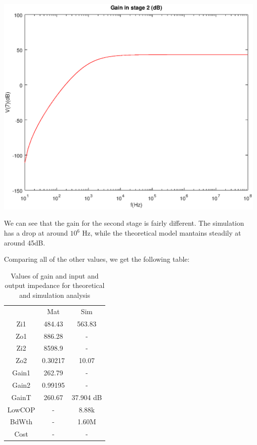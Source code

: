 \hspace{1mm}
\begin{minipage}[c]{0.50\linewidth}
\includegraphics[width=1\linewidth]{vo2.eps}
\end{minipage}

We can see that the gain for the second stage is fairly different. The simulation has a drop at around $10^6$ Hz, while the theoretical model mantains steadily at around 45dB.

Comparing all of the other values, we get the following table: 


\begin{table}[H]
\addtolength{\tabcolsep}{-4pt}
\caption{Values of gain and input and output impedance for theoretical and simulation analysis}
\vspace{-3mm}
\begin{tabular}{|c|c|c|}
\hline
 &	Mat &	Sim\\

Zi1 &484.43&	563.83\\

Zo1&886.28	&-\\

Zi2&	8598.9	&-\\

Zo2&	0.30217&	10.07\\

Gain1&	262.79	&-\\

Gain2&	0.99195&-\\	

GainT&	260.67	&37.904 dB\\

LowCOP&	-&	8.88k\\

BdWth	&-	&1.60M\\

Cost	&-&	-\\
\hline
\end{tabular}
\label{tab:Comparison}
\end{table}

